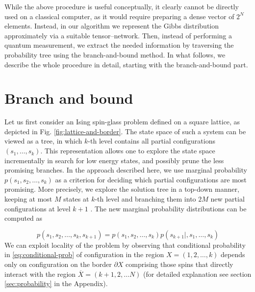     While the above procedure is useful conceptually, it clearly cannot be directly
    used on a classical computer, as it would require preparing a dense vector of
  $2^{N}$ elements. Instead, in our algorithm we represent the Gibbs distribution
approximately via a suitable tensor--network. Then, instead of performing a
quantum measurement, we extract the needed information by traversing the
probability tree using the branch-and-bound method. In what follows, we
describe the whole procedure in detail, starting with the branch-and-bound
part.

\section{Branch and bound}
Let us first consider an Ising spin-glass problem defined on a square lattice,
as depicted in Fig. \ref{fig:lattice-and-border}. The state space of such a
system can be viewed as a tree, in which $k$-th level contains all partial
configurations $(s_1, \ldots, s_k)$. This representation allows one to explore
the state space incrementally in search for low energy states, and possibly
prune the less promising branches. In the approach described here, we use
marginal probability $p(s_1, s_2, \ldots, s_k)$ as a criterion for deciding
which partial configurations are most promising. More precisely, we explore the
solution tree in a top-down manner, keeping at most $M$ states at $k$-th level
and branching them into $2M$ new partial configurations at level $k+1$ . The
new marginal probability distributions can be computed as

\begin{equation}
  \label{eq:conditional-prob}
  p(s_1, s_2, \ldots, s_k, s_{k+1}) = p(s_1, s_2, \ldots, s_k)p(s_{k+1}|, s_1, \ldots, s_k)
\end{equation}
We can exploit locality of the problem by observing that conditional
probability in \eqref{eq:conditional-prob} of configuration in the region $X =
  (1, 2, \ldots, k)$ depends only on configuration on the border $\partial X$ comprising those spins that directly interact with the region
$\overline{X} = (k+1, 2, \ldots N)$ (for detailed explanation see section
\ref{sec:probability} in the Appendix).

